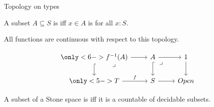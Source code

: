 \documentclass{beamer}
\begin{document}
\begin{frame}[fragile]{Topology on types}
\begin{definition}
  A subset $A\subseteq S$ is 
  \only<-1>{closed}\only<2->{open}
  iff $x\in A$ is 
  for all $x:S$. 
\end{definition}
\pause
\pause
\begin{corollary}
  All functions are continuous with respect to this topology.
\end{corollary}
\pause 
$$
\begin{tikzcd} 
  \only<6->{f^{-1}(A) \arrow[r] \arrow[d, hook] \arrow[rd,"\lrcorner"{pos=0.125}, phantom]}
  &   
  A \arrow[d,hook] \arrow[r] \arrow[rd,"\lrcorner"{pos=0.125}, phantom] & 1 \arrow[d]\\
  \only<5->{T \arrow[r, "f"] } & S \arrow[r] & Open
\end{tikzcd}
$$
\pause 
\pause 
\pause 
\begin{lemma}
  A subset of a Stone space is 
  iff 
  it is a countable  of decidable subsets.
\end{lemma}
\end{frame}
\end{document}
